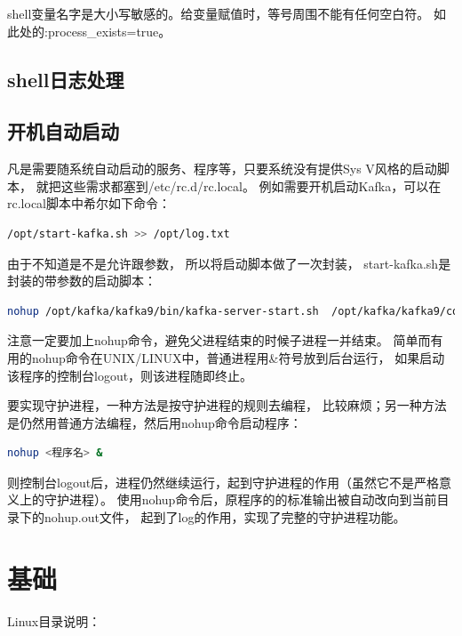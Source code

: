 \documentclass{book}
\begin{document}
shell变量名字是大小写敏感的。给变量赋值时，等号周围不能有任何空白符。
如此处的:process\_exists=true。

\subsection{shell日志处理}

\subsection{开机自动启动}

凡是需要随系统自动启动的服务、程序等，只要系统没有提供Sys V风格的启动脚本，
就把这些需求都塞到/etc/rc.d/rc.local。
例如需要开机启动Kafka，可以在rc.local脚本中希尔如下命令：

\begin{lstlisting}[language=Bash]
/opt/start-kafka.sh >> /opt/log.txt
\end{lstlisting}

由于不知道是不是允许跟参数，
所以将启动脚本做了一次封装，
start-kafka.sh是封装的带参数的启动脚本：

\begin{lstlisting}[language=Bash]
nohup /opt/kafka/kafka9/bin/kafka-server-start.sh  /opt/kafka/kafka9/config/server.properties & >> /opt/log.txt
\end{lstlisting}

注意一定要加上nohup命令，避免父进程结束的时候子进程一并结束。
简单而有用的nohup命令在UNIX/LINUX中，普通进程用\&符号放到后台运行，
如果启动该程序的控制台logout，则该进程随即终止。

要实现守护进程，一种方法是按守护进程的规则去编程，
比较麻烦；另一种方法是仍然用普通方法编程，然后用nohup命令启动程序：

\begin{lstlisting}[language=Bash]
nohup <程序名> &
\end{lstlisting}  

则控制台logout后，进程仍然继续运行，起到守护进程的作用（虽然它不是严格意义上的守护进程）。
使用nohup命令后，原程序的的标准输出被自动改向到当前目录下的nohup.out文件，
起到了log的作用，实现了完整的守护进程功能。

\section{基础}

Linux目录说明：
\end{document}
